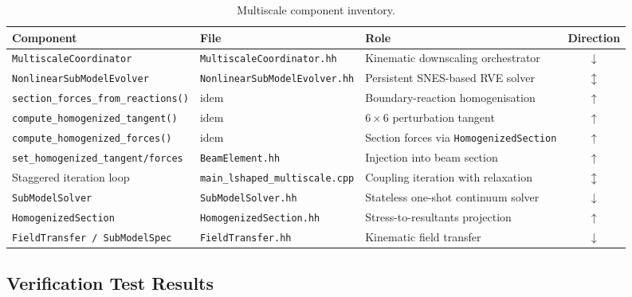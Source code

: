 \begin{table}[htbp]
  \centering
  \caption{Multiscale component inventory.}
  \label{tab:ms-components}
  \small
  \begin{tabular}{@{}lllc@{}}
    \toprule
    \textbf{Component} & \textbf{File} & \textbf{Role} & \textbf{Direction} \\
    \midrule
    \texttt{MultiscaleCoordinator}
      & \texttt{MultiscaleCoordinator.hh}
      & Kinematic downscaling orchestrator
      & $\downarrow$ \\
    \texttt{NonlinearSubModelEvolver}
      & \texttt{NonlinearSubModelEvolver.hh}
      & Persistent SNES-based RVE solver
      & $\updownarrow$ \\
    \texttt{section\_forces\_from\_reactions()}
      & idem
      & Boundary-reaction homogenisation
      & $\uparrow$ \\
    \texttt{compute\_homogenized\_tangent()}
      & idem
      & $6 \times 6$ perturbation tangent
      & $\uparrow$ \\
    \texttt{compute\_homogenized\_forces()}
      & idem
      & Section forces via \texttt{HomogenizedSection}
      & $\uparrow$ \\
    \texttt{set\_homogenized\_tangent/forces}
      & \texttt{BeamElement.hh}
      & Injection into beam section
      & $\uparrow$ \\
    Staggered iteration loop
      & \texttt{main\_lshaped\_multiscale.cpp}
      & Coupling iteration with relaxation
      & $\updownarrow$ \\
    \texttt{SubModelSolver}
      & \texttt{SubModelSolver.hh}
      & Stateless one-shot continuum solver
      & $\downarrow$ \\
    \texttt{HomogenizedSection}
      & \texttt{HomogenizedSection.hh}
      & Stress-to-resultants projection
      & $\uparrow$ \\
    \texttt{FieldTransfer / SubModelSpec}
      & \texttt{FieldTransfer.hh}
      & Kinematic field transfer
      & $\downarrow$ \\
    \bottomrule
  \end{tabular}
\end{table}

\subsection{Verification Test Results}

